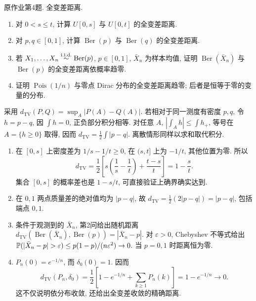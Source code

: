 \begin{exercise}\label{ps03:p04}
原作业第4题. 全变差距离.
\begin{enumerate}[label=\arabic*.]
\item 对 $0<s\le t$, 计算 $U[0,s]$ 与 $U[0,t]$ 的全变差距离.
\item 对 $p,q\in[0,1]$, 计算 $\operatorname{Ber}(p)$ 与 $\operatorname{Ber}(q)$ 的全变差距离.
\item 若 $X_1,\ldots,X_n\stackrel{\mathrm{i.i.d.}}{\sim}\operatorname{Ber}(p)$, $p\in[0,1]$, $\bar X_n$ 为样本均值, 证明 $\operatorname{Ber}(\bar X_n)$ 与 $\operatorname{Ber}(p)$ 的全变差距离依概率趋零.
\item 证明 $\operatorname{Pois}(1/n)$ 与零点 Dirac 分布的全变差距离趋零; 后者是恒等于零的变量的分布.
\end{enumerate}
\end{exercise}
\begin{solution}
采用 $d_{\mathrm{TV}}(P,Q)=\sup_A|P(A)-Q(A)|$. 若相对于同一测度有密度 $p,q$, 令 $h=p-q$, 因 $\int h=0$, 正负部分积分相等. 对任意 $A$, $|\int_Ah|\le\int h_+$, 等号在 $A=\{h\ge0\}$ 取得, 因而 $d_{\mathrm{TV}}=\frac12\int|p-q|$. 离散情形同样以求和取代积分.
\begin{enumerate}[label=\arabic*.]
\item 在 $[0,s]$ 上密度差为 $1/s-1/t\ge0$, 在 $(s,t]$ 上为 $-1/t$, 其他位置为零. 所以
\[
d_{\mathrm{TV}}=\frac12\left[s\left(\frac1s-\frac1t\right)+\frac{t-s}{t}\right]
=1-\frac st.
\]
集合 $[0,s]$ 的概率差也是 $1-s/t$, 可直接验证上确界确实达到.
\item 在 $0,1$ 两点质量差的绝对值均为 $|p-q|$, 故 $d_{\mathrm{TV}}=\frac12(2|p-q|)=|p-q|$, 包括端点 $0,1$.
\item 条件于观测到的 $\bar X_n$, 第2问给出随机距离 $d_{\mathrm{TV}}(\operatorname{Ber}(\bar X_n),\operatorname{Ber}(p))=|\bar X_n-p|$. 对 $\varepsilon>0$, Chebyshev 不等式给出
$\PP(|\bar X_n-p|>\varepsilon)\le p(1-p)/(n\varepsilon^2)\to0$. 当 $p=0,1$ 时距离恒为零.
\item $P_n(0)=e^{-1/n}$, 而 $\delta_0(0)=1$. 因而
\[
d_{\mathrm{TV}}(P_n,\delta_0)
=\frac12\left[1-e^{-1/n}+\sum_{k\ge1}P_n(k)\right]
=1-e^{-1/n}\to0.
\]
这不仅说明依分布收敛, 还给出全变差收敛的精确距离.
\end{enumerate}
\end{solution}
